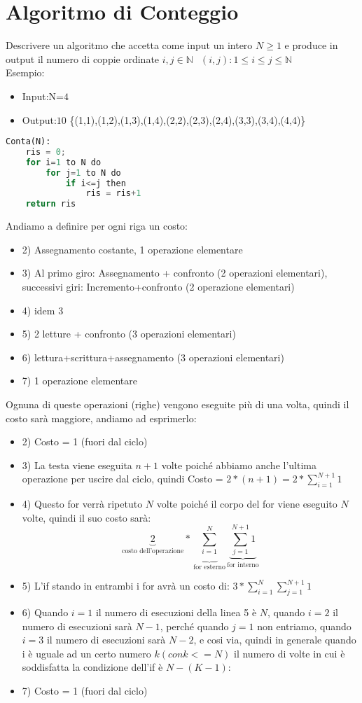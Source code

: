 \section{Algoritmo di Conteggio}
Descrivere un algoritmo che accetta come input un intero $N \ge 1 $ e produce in output il numero di coppie
ordinate $i,j \in \mathbb{N} \; \, \; (i,j): 1 \le i \le j \le \mathbb{N} $\\
Esempio:\\
\begin{itemize}
\item Input:N=$4$ 
\item Output:$10$ \{(1,1),(1,2),(1,3),(1,4),(2,2),(2,3),(2,4),(3,3),(3,4),(4,4)\}
\end{itemize}

\begin{lstlisting}[language=Python]
Conta(N):
	ris = 0;
	for i=1 to N do
		for j=1 to N do
			if i<=j then
				ris = ris+1
	return ris
\end{lstlisting}

Andiamo a definire per ogni riga un costo:
\begin{itemize}
\item 2) Assegnamento costante, 1 operazione elementare
\item 3) Al primo giro: Assegnamento + confronto (2 operazioni elementari), successivi giri: Incremento+confronto (2 operazione elementari)
\item 4) idem $3$
\item 5) 2 letture + confronto (3 operazioni elementari)
\item 6) lettura+scrittura+assegnamento (3 operazioni elementari)
\item 7) 1 operazione elementare
\end{itemize}

Ognuna di queste operazioni (righe) vengono eseguite più di una volta, quindi il costo sarà maggiore, andiamo ad esprimerlo:\\

\begin{itemize}
\item 2) Costo = 1 (fuori dal ciclo)
\item 3) La testa viene eseguita $n+1$ volte poiché abbiamo anche l'ultima operazione per uscire dal ciclo, quindi Costo = $2*(n+1) = 2 * \sum_{i=1}^{N+1} 1$
\item 4) Questo for verrà ripetuto $N$ volte poiché il corpo del for viene eseguito $N$ volte, quindi il suo costo sarà:
$$ \underbrace{2}_{\text{costo dell'operazione}}*\underbrace{\sum_{i=1}^{N}}_{\text{for esterno}} \underbrace{\sum_{j=1}^{N+1} 1}_{\text{for interno}}$$
\item 5) L'if stando in entrambi i for avrà un costo di: $3*\sum_{i=1}^{N} \sum_{j=1}^{N+1} 1$
\item 6) Quando $i=1$ il numero di esecuzioni della linea 5 è $N$, quando $i=2$ il numero di esecuzioni sarà $N-1$, perché quando $j=1$ non entriamo, quando $i=3$ il numero di esecuzioni sarà $N-2$, e cosi via, quindi in generale quando i è uguale ad un certo numero $k(con k<=N)$ il numero di volte in cui è soddisfatta la condizione dell’if è $N-(K - 1)$:
\item 7) Costo = 1 (fuori dal ciclo)
\end{itemize}
